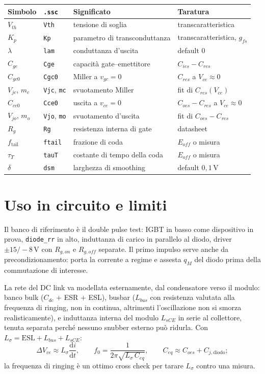 \documentclass[11pt,a4paper]{article}
\newcommand{\ud}{\mathrm{d}}
\newcommand{\ssc}[1]{\texttt{#1}}
\begin{document}
\begin{center}
\begin{tabular}{llll}
\hline
Simbolo & \ssc{.ssc} & Significato & Taratura \\
\hline
$V_{th}$ & \ssc{Vth}  & tensione di soglia & transcaratteristica \\
$K_p$    & \ssc{Kp}   & parametro di transconduttanza & transcaratteristica, $g_{fs}$ \\
$\lambda$& \ssc{lam}  & conduttanza d'uscita & default $0$ \\
$C_{ge}$ & \ssc{Cge}  & capacit\`a gate--emettitore & $C_{ies}-C_{res}$ \\
$C_{gc0}$& \ssc{Cgc0} & Miller a $v_{gc}=0$ & $C_{res}$ a $V_{ce}\approx 0$ \\
$V_{jc}$, $m_c$ & \ssc{Vjc}, \ssc{mc} & svuotamento Miller & fit di $C_{res}(V_{ce})$ \\
$C_{ce0}$& \ssc{Cce0} & uscita a $v_{ce}=0$ & $C_{oes}-C_{res}$ a $V_{ce}\approx 0$ \\
$V_{jo}$, $m_o$ & \ssc{Vjo}, \ssc{mo} & svuotamento d'uscita & fit di $C_{oes}-C_{res}$ \\
$R_g$    & \ssc{Rg}   & resistenza interna di gate & datasheet \\
$f_{\mathrm{tail}}$ & \ssc{ftail} & frazione di coda & $E_{off}$ o misura \\
$\tau_T$ & \ssc{tauT} & costante di tempo della coda & $E_{off}$ o misura \\
$\delta$ & \ssc{dsm}  & larghezza di smoothing & default $0{,}1\,$V \\
\hline
\end{tabular}
\end{center}

\section{Uso in circuito e limiti}

Il banco di riferimento \`e il double pulse test: IGBT in basso come
dispositivo in prova, \ssc{diode\_rr} in alto, induttanza di carico in
parallelo al diodo, driver $\pm 15/{-}8\,$V con $R_{g,on}$ e $R_{g,off}$
separate. Il primo impulso serve anche da precondizionamento: porta la
corrente a regime e assesta $q_M$ del diodo prima della commutazione di
interesse.

La rete del DC link va modellata esternamente, dal condensatore verso il
modulo: banco bulk ($C_{dc}$ + ESR + ESL), busbar ($L_{bus}$ con
resistenza valutata alla frequenza di ringing, non in continua,
altrimenti l'oscillazione non si smorza realisticamente), e induttanza
interna del modulo $L_{sCE}$ in serie al collettore, tenuta separata
perch\'e nessuno snubber esterno pu\`o ridurla. Con
$L_\sigma = \mathrm{ESL} + L_{bus} + L_{sCE}$:
\begin{equation}
\Delta V_{ce} \approx L_\sigma \frac{\ud i}{\ud t},
\qquad
f_0 = \frac{1}{2\pi \sqrt{L_\sigma\, C_{eq}}},
\qquad
C_{eq} \approx C_{oes} + C_{j,\mathrm{diodo}};
\end{equation}
la frequenza di ringing \`e un ottimo cross check per tarare
$L_\sigma$ contro una misura.
\end{document}
